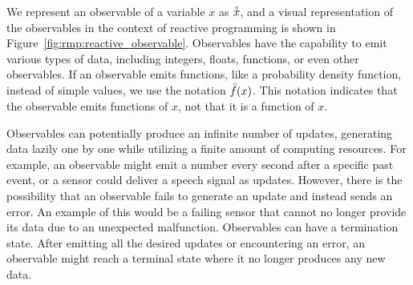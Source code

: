 We represent an observable of a variable $x$ as $\accentset{\circ}{x}$, and a visual representation of the
observables in the context of reactive programming is shown in
Figure~\ref{fig:rmp:reactive_observable}.
Observables have the capability to emit various types of data, including integers, floats,
functions, or even other observables.
If an observable emits functions, like a probability density function, instead of simple
values, we use the notation $\accentset{\circ}{f}(x)$.
This notation indicates that the observable emits functions of $x$, not that it is a function
of $x$.

Observables can potentially produce an infinite number of updates, generating data lazily one
by one while utilizing a finite amount of computing resources.
For example, an observable might emit a number every second after a specific past event, or a sensor could deliver a speech signal as updates.
However, there is the possibility that an observable fails to generate an update and instead
sends an error.
An example of this would be a failing sensor that cannot no longer provide its data due to an
unexpected malfunction.
Observables can have a termination state.
After emitting all the desired updates or encountering an error, an observable might reach a
terminal state where it no longer produces any new data.

